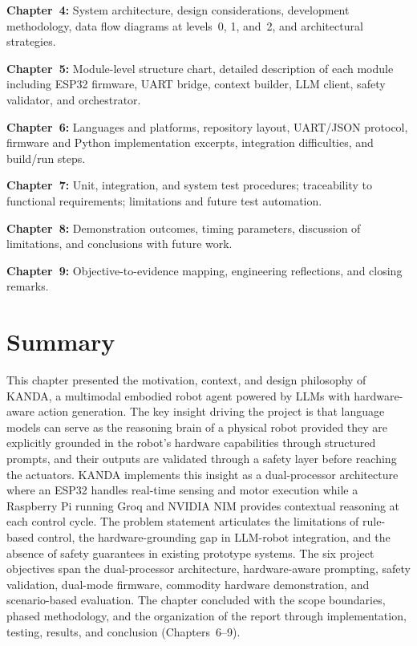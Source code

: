 \textbf{Chapter~4:} System architecture, design considerations, development methodology, data flow diagrams at levels~0, 1, and~2, and architectural strategies.

\textbf{Chapter~5:} Module-level structure chart, detailed description of each module including ESP32 firmware, UART bridge, context builder, LLM client, safety validator, and orchestrator.

\textbf{Chapter~6:} Languages and platforms, repository layout, UART/JSON protocol, firmware and Python implementation excerpts, integration difficulties, and build/run steps.

\textbf{Chapter~7:} Unit, integration, and system test procedures; traceability to functional requirements; limitations and future test automation.

\textbf{Chapter~8:} Demonstration outcomes, timing parameters, discussion of limitations, and conclusions with future work.

\textbf{Chapter~9:} Objective-to-evidence mapping, engineering reflections, and closing remarks.

\section{Summary}
\label{sec:ch1summary}

This chapter presented the motivation, context, and design philosophy of KANDA, a multimodal embodied robot agent powered by LLMs with hardware-aware action generation. The key insight driving the project is that language models can serve as the reasoning brain of a physical robot provided they are explicitly grounded in the robot's hardware capabilities through structured prompts, and their outputs are validated through a safety layer before reaching the actuators. KANDA implements this insight as a dual-processor architecture where an ESP32 handles real-time sensing and motor execution while a Raspberry Pi running Groq and NVIDIA NIM provides contextual reasoning at each control cycle. The problem statement articulates the limitations of rule-based control, the hardware-grounding gap in LLM-robot integration, and the absence of safety guarantees in existing prototype systems. The six project objectives span the dual-processor architecture, hardware-aware prompting, safety validation, dual-mode firmware, commodity hardware demonstration, and scenario-based evaluation. The chapter concluded with the scope boundaries, phased methodology, and the organization of the report through implementation, testing, results, and conclusion (Chapters~6--9).
